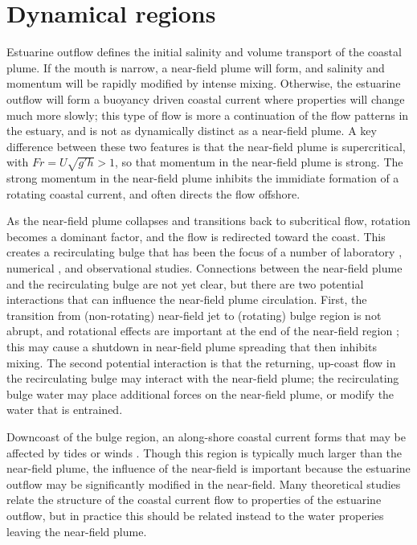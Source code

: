 \documentclass[12pt]{article}
\begin{document}
\section{Dynamical regions}

Estuarine outflow defines the initial salinity and volume transport of the coastal plume.  If the mouth is narrow, a near-field plume will form, and salinity and momentum will be rapidly modified by intense mixing. Otherwise, the estuarine outflow will form a buoyancy driven coastal current where properties will change much more slowly; this type of flow is more a continuation of the flow patterns in the estuary, and is not as dynamically distinct as a near-field plume. A key difference between these two features is that the near-field plume is supercritical, with $Fr = U \sqrt{g' h} > 1$, so that momentum in the near-field plume is strong. The strong momentum in the near-field plume inhibits the immidiate formation of a rotating coastal current, and often directs the flow offshore. 

As the near-field plume collapses and transitions back to subcritical flow, rotation becomes a dominant factor, and the flow is redirected toward the coast. This creates a recirculating bulge that has been the focus of a number of laboratory \citep{avicola.huq:03b,horner-devine.ea:06}, numerical \citep{fong.geyer:02,isobe:05}, and observational \citep{horner-devine:09,kudela.ea:10} studies. Connections between the near-field plume and the recirculating bulge are not yet clear, but there are two potential interactions that can influence the near-field plume circulation. First, the transition from (non-rotating) near-field jet to (rotating) bulge region is not abrupt, and rotational effects are important at the end of the near-field region \citep{cole.dissertation}; this may cause a shutdown in near-field plume spreading that then inhibits mixing. The second potential interaction is that the returning, up-coast flow in the recirculating bulge may interact with the near-field plume; the recirculating bulge water may place additional forces on the near-field plume, or modify the water that is entrained.

Downcoast of the bulge region, an along-shore coastal current forms \citep{} that may be affected by tides \citep{deboer.ea:08,pritchard.huntley:06} or winds \citep{fong.geyer:01,hetland:05,lentz:04,jurisa.chant:13}. Though this region is typically much larger than the near-field plume, the influence of the near-field is important because the estuarine outflow may be significantly modified in the near-field. Many theoretical studies relate the structure of the coastal current flow to properties of the estuarine outflow, but in practice this should be related instead to the water properies leaving the near-field plume.
\end{document}

